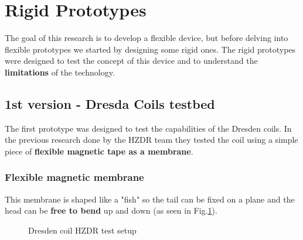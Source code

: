 \section{Rigid Prototypes}
The goal of this research is to develop a flexible device, but before delving into flexible prototypes we started by designing some rigid ones. The rigid prototypes were designed to test the concept of this device and to understand the \textbf{limitations} of the technology.

\subsection{1st version - Dresda Coils testbed}
The first prototype was designed to test the capabilities of the Dresden coils.
In the previous research done by the HZDR team \cite{HZDR} they tested the coil using a simple piece of \textbf{flexible magnetic tape as a membrane}.

\subsubsection{Flexible magnetic membrane}
\begin{samepage}
    This membrane is shaped like a "fish" so the tail can be fixed on a plane and the head can be \textbf{free to bend} up and down (as seen in Fig.\ref{fig: Dresden_test}).
    \nopagebreak

    \begin{figure}[H]
        \centering
        \caption{Dresden coil HZDR test setup}
        \label{fig: Dresden_test}
    \end{figure}
\end{samepage}

